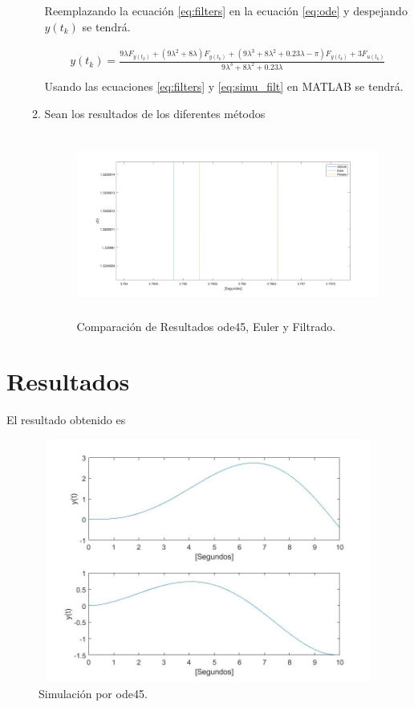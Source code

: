 \documentclass[12pt]{article}
\begin{document}
\begin{enumerate}
\begin{enumerate}
        Reemplazando la ecuación \ref{eq:filters} en la ecuación \ref{eq:ode} y despejando $y({t_k})$ se tendrá. 

        \begin{equation}
            \begin{split}
                y(t_{k})=\frac{9\lambda F_{\ddot{y}(t_{k})}+(9\lambda^2+8\lambda)F_{\dot{y}(t_{k})}+(9\lambda^3+8\lambda^2+0.23\lambda-\pi)F_{y(t_{k})}+3F_{u(t_{k})}}{9\lambda^3+8\lambda^2+0.23\lambda}\\
            \end{split}
            \label{eq:simu_filt}
        \end{equation}
        Usando las ecuaciones \ref{eq:filters} y \ref{eq:simu_filt} en MATLAB se tendrá.
        
        
        \item Sean los resultados de los diferentes métodos
        \begin{figure}[h]
            \centering
            \includegraphics[width=15cm,height=6cm]{IMAGENES/12.jpg}
            \caption{Comparación de Resultados ode45, Euler y Filtrado.}
        \end{figure}
    \end{enumerate}
\end{enumerate}
\section{Resultados}

El resultado obtenido es
        \begin{figure}[h]
            \centering
            \includegraphics[width=13cm,height=8cm]{IMAGENES/9.jpg}
            \caption{Simulación por ode45.}
        \end{figure}
\end{document}
